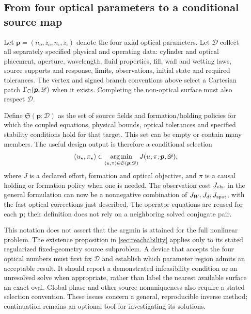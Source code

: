 \subsection{From four optical parameters to a conditional source map}
Let $\bm p=(n_o,z_o,n_i,z_i)$ denote the four axial optical parameters. Let
$\mathscr D$ collect all separately specified physical and operating data:
cylinder and optical placement, aperture, wavelength, fluid properties, fill,
wall and wetting laws, source supports and response, limits, observations,
initial state and required tolerances. The vertex and signed branch conventions
above select a Cartesian patch $\Gamma_{\rm C}(\bm p;\mathscr D)$ when it
exists. Completing the non-optical surface must also respect $\mathscr D$.

Define $\mathfrak S(\bm p;\mathscr D)$ as the set of source fields and
formation/holding policies for which the coupled equations, physical bounds,
optical tolerances and specified stability conditions hold for that target.
This set can be empty or contain many members. The useful design output is
therefore a conditional selection
\begin{equation}
 (u_\star,\pi_\star)\in
 \operatorname*{arg\,min}_{(u,\pi)\in\mathfrak S(\bm p;\mathscr D)}J(u,\pi;\bm p,\mathscr D),
 \label{eq:cartesian-source-selection}
\end{equation}
where $J$ is a declared effort, formation and optical objective, and $\pi$
is a causal holding or formation policy when one is needed. The observation
cost $J_{\rm obs}$ in the general formulation can now be a nonnegative
combination of $J_W,J_d,J_{\rm spot}$, with the fast optical corrections just
described. The operator equations are reused for each $\bm p$; their definition
does not rely on a neighboring solved conjugate pair.

This notation does not assert that the argmin is attained for the full
nonlinear problem. The existence proposition in \cref{sec:reachability}
applies only to its stated regularized fixed-geometry source subproblem.
A device that accepts the four optical numbers must first fix $\mathscr D$
and establish which parameter region admits an acceptable result. It should
report a demonstrated infeasibility condition or an unresolved solve when
appropriate, rather than label the nearest available surface an exact oval.
Global phase and other source nonuniqueness also require a stated selection
convention. These issues concern a general, reproducible inverse method;
continuation remains an optional tool for investigating its solutions.
